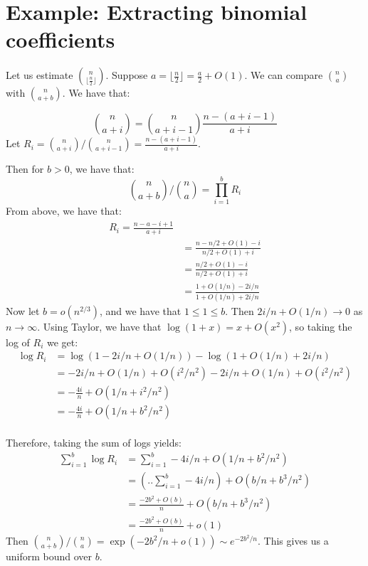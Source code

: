\documentclass[]{article}
\theoremstyle{definition}
\numberwithin{theorem}{section}
\numberwithin{equation}{section}
\begin{document}
\section{Example: Extracting binomial coefficients}
Let us estimate $\binom{n}{\lfloor \frac{n}{2} \rfloor}$. Suppose $a = \lfloor \frac{n}{2} \rfloor = \frac{a}{2} + O(1)$. 
We can compare $\binom{n}{a}$ with $\binom{n}{a + b}$. We have that:

\begin{equation}
	\binom{n}{a + i} = \binom{n}{a + i - 1} \frac{n - (a + i - 1)}{a + i}
\end{equation}
Let $R_i = \binom{n}{a + i}/ \binom{n}{a + i - 1} = \frac{n - (a + i - 1)}{a + i}$.

Then for $b > 0$, we have that:
\begin{equation}
	\binom{n}{a + b}/ \binom{n}{a } = \prod_{i = 1}^b R_i
\end{equation}
From above, we have that:
\begin{align*}
	R_i = \frac{n - a - i + 1}{a + i}\\
	&= \frac{n - n/2 + O(1) - i}{n/2 + O(1) + i}\\
	&= \frac{n/2 + O(1) - i}{n/2 + O(1) + i}\\
	&= \frac{1 + O(1/n) - 2i/n}{1 + O(1/n) + 2i/n}
\end{align*}
Now let $b = o(n^{2/3})$, and we have that $1 \leq 1 \leq b$. Then $2i/n + O(1/n) \rightarrow 0$ as $n \rightarrow \infty$. Using Taylor, we have that $\log(1 + x) = x + O(x^2)$, so taking the log of $R_i$ we get:
\begin{align*}
	\log R_i &= \log(1 - 2i/n + O(1/n))- \log(1 + O(1/n) + 2i/n)\\
	&= -2i/n + O(1/n) + O(i^2/n^2) - 2i/n + O(1/n) + O(i^2/n^2)\\
	&= -\frac{4i}{n} + O(1/n + i^2/n^2)\\
	&= -\frac{4i}{n} + O(1/n + b^2/n^2)\\
\end{align*}

Therefore, taking the sum of logs yields:
\begin{align*}
\sum_{i = 1}^b \log R_i &= 	\sum_{i = 1}^{b} - 4i/n + O(1/n + b^2/n^2)\\
&= \left(..\sum_{i = 1}^{b} - 4i/n\right) + O(b/n + b^3/n^2)\\
&= \frac{-2b^2 + O(b)}{n} + O(b/n + b^3/n^2)\\
&= \frac{-2b^2 + O(b)}{n} + o(1)
\end{align*}
Then $\binom{n}{a + b}/ \binom{n}{a} = \exp(-2b^2/n + o(1)) \sim e^{-2b^2/n}$. 
This gives us a uniform bound over $b$. 
\end{document}

